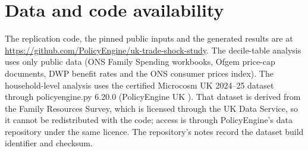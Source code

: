 \section*{Data and code availability}

The replication code, the pinned public inputs and the generated
results are at \url{https://github.com/PolicyEngine/uk-trade-shock-study}.
The decile-table analysis uses only public data (ONS Family Spending
workbooks, Ofgem price-cap documents, DWP benefit rates and the ONS
consumer prices index). The household-level analysis uses the
certified Microcosm UK 2024--25 dataset through policyengine.py 6.20.0
(PolicyEngine UK \SsPolicyEngineVersion). That dataset is derived from
the Family Resources Survey, which is licensed through the UK Data
Service, so it cannot be redistributed with the code; access is
through PolicyEngine's data repository under the same licence. The
repository's notes record the dataset build identifier and checksum.
\label{sec:mainend}
